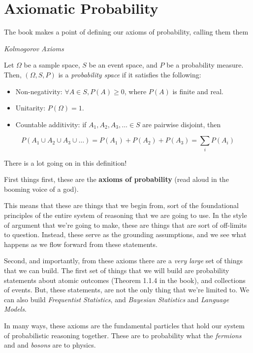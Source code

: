 \documentclass[
  letterpaper,
  DIV=11,
  numbers=noendperiod]{scrreprt}
\providecommand{\tightlist}{%
  \setlength{\itemsep}{0pt}\setlength{\parskip}{0pt}}\usepackage{longtable,booktabs,array}
\begin{document}
\section{Axiomatic Probability}\label{axiomatic-probability}

The book makes a point of defining our axioms of probability, calling
them them

\emph{Kolmogorov Axioms}

Let \(\Omega\) be a sample space, \(S\) be an event space, and \(P\) be
a probability measure. Then, \((\Omega, S, P)\) is a \emph{probability
space} if it satisfies the following:

\begin{itemize}
\tightlist
\item
  Non-negativity: \(\forall A \in S, P(A) \geq 0\), where \(P(A)\) is
  finite and real.
\item
  Unitarity: \(P(\Omega)=1\).
\item
  Countable additivity: if \(A_1, A_2, A_3, \dots \in S\) are pairwise
  disjoint, then
\end{itemize}

\[
P(A_1 \cup A_2 \cup A_3 \cup \dots) = P(A_1) + P(A_2) + P(A_3) = \sum_{i}P(A_{i})
\]

There is a lot going on in this definition!

First things first, these are the \textbf{axioms of probability} (read
aloud in the booming voice of a god).

This means that these are things that we begin from, sort of the
foundational principles of the entire system of reasoning that we are
going to use. In the style of argument that we're going to make, these
are things that are sort of off-limits to question. Instead, these serve
as the grounding assumptions, and we see what happens as we flow forward
from these statements.

Second, and importantly, from these axioms there are a \emph{very large}
set of things that we can build. The first set of things that we will
build are probability statements about atomic outcomes (Theorem 1.1.4 in
the book), and collections of events. But, these statements, are not the
only thing that we're limited to. We can also build \emph{Frequentist
Statistics}, and \emph{Bayesian Statistics} and \emph{Language Models}.

In many ways, these axioms are the fundamental particles that hold our
system of probabilistic reasoning together. These are to probability
what the \emph{fermions} and and \emph{bosons} are to physics.
\end{document}
